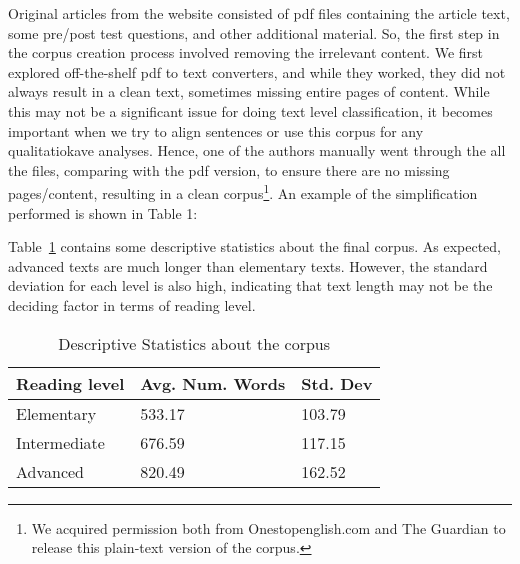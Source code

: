 \documentclass[11pt,a4paper]{article}
\begin{document}
Original articles from the website consisted of pdf files containing the article text, some pre/post test questions, and other additional material. So, the first step in the corpus creation process involved removing the irrelevant content. We first explored off-the-shelf pdf to text converters, and while they worked, they did not always result in a clean text, sometimes missing entire pages of content. While this may not be a significant issue for doing text level classification, it becomes important when we try to align sentences or use this corpus for any qualitatiokave analyses. Hence, one of the authors manually went through the all the files, comparing with the pdf version, to ensure there are no missing pages/content, resulting in a clean corpus\footnote{We acquired permission both from Onestopenglish.com and The Guardian to release this plain-text version of the corpus.}. An example of the simplification performed is shown in Table 1:

Table~\ref{tab:desc} contains some descriptive statistics about the final corpus. As expected, advanced texts are much longer than elementary texts. However, the standard deviation for each level is also high, indicating that text length may not be the deciding factor in terms of reading level. 

\begin{center}
\begin{table}[h!]
\begin{tabular}{|l|l|l|}
\hline Reading level & Avg. Num. Words & Std. Dev \\
\hline  Elementary & 533.17 & 103.79 \\
\hline Intermediate & 676.59& 117.15 \\
\hline Advanced&820.49&162.52\\ \hline
\end{tabular}
\caption{Descriptive Statistics about the corpus}
\label{tab:desc}
\end{table}
\end{center}
\end{document}
